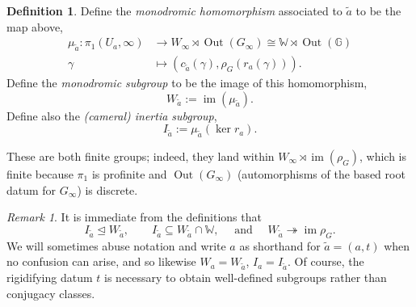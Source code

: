 \documentclass[openany]{amsbook}
\theoremstyle{definition}
\newtheorem{definition}[theorem]{Definition}
\theoremstyle{remark}
\newtheorem{remark}[theorem]{Remark}
\numberwithin{equation}{section}
\newcommand{\G}{\mathbb{G}}
\newcommand{\W}{\mathbb{W}}
\newcommand{\im}{\operatorname{im}}
\newcommand{\normsg}{\trianglelefteq}
\renewcommand{\-}{\operatorname{-}}
\newcommand{\Out}{\operatorname{Out}}
\newcommand{\wtilde}[1]{\widetilde{#1}}
\begin{document}
\begin{definition}\label{def.monodr.inv.Out}
    Define the \emph{monodromic homomorphism} associated to $\wtilde{a}$ to be the map above,
    \begin{align*}
        \mu_{\wtilde{a}} : \pi_1(U_a, \infty) &\to W_\infty \rtimes \Out(G_\infty) \cong \W \rtimes \Out(\G) \\
        \gamma &\mapsto (c_{\wtilde{a}}(\gamma), \rho_G(r_a(\gamma))).
    \end{align*}
    Define the \emph{monodromic subgroup} to be the image of this homomorphism, 
     $$W_{\wtilde{a}} := \im(\mu_{\wtilde{a}}).$$ Define also the \emph{(cameral) inertia subgroup},
     $$
        I_{\wtilde{a}} := \mu_{\wtilde{a}}(\ker r_a).
     $$
\end{definition}

These are both finite groups; indeed, they land within $W_\infty \rtimes \im(\rho_G)$, which is finite because $\pi_1$ is profinite and $\Out(G_\infty)$ (automorphisms of the based root datum for $G_\infty$) is discrete.

\begin{remark}
    It is immediate from the definitions that
    $$
        I_{\wtilde{a}} \normsg W_{\wtilde{a}}, \qquad I_{\wtilde{a}} \subseteq W_{\wtilde{a}} \cap \W, \quad \text{ and } \quad W_{\wtilde{a}} \twoheadrightarrow \im \rho_G.
    $$
    We will sometimes abuse notation and write $a$ as shorthand for $\wtilde{a} = (a,t)$ when no confusion can arise, and so likewise $W_a = W_{\wtilde{a}}$, $I_a = I_{\wtilde{a}}$. Of course, the rigidifying datum $t$ is necessary to obtain well-defined subgroups rather than conjugacy classes.
\end{remark}
\end{document}
